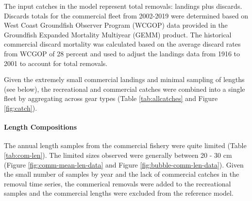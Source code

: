 \documentclass[11pt,
  english,
  a4paper,
]{article}
\begin{document}
\leavevmode\tagmcend\tagstructend\par


The input catches in the model represent total removals: landings plus discards. Discards totals for the commercial fleet from 2002-2019 were determined based on West Coast Groundfish Observer Program (WCGOP) data provided in the Groundfish Expanded Mortality Multiyear (GEMM) product. The historical commercial discard mortality was calculated based on the average discard rates from WCGOP of 28 percent and used to adjust the landings data from 1916 to 2001 to account for total removals.

\leavevmode\tagmcend\tagstructend\par


Given the extremely small commercial landings and minimal sampling of lengths (see below), the recreational and commercial catches were combined into a single fleet by aggregating across gear types (Table \ref{tab:allcatches} and Figure \ref{fig:catch}).

\leavevmode\tagmcend\tagstructend\par


\hypertarget{length-compositions-1}{%
\paragraph{Length Compositions}\label{length-compositions-1}}

\leavevmode\tagmcend\tagstructend


The annual length samples from the commercial fishery were quite limited (Table \ref{tab:com-len}). The limited sizes observed were generally between 20 - 30 cm (Figure \ref{fig:comm-mean-len-data} and Figure \ref{fig:bubble-comm-len-data}). Given the small number of samples by year and the lack of commercial catches in the removal time series, the commerical removals were added to the recreational samples and the commercial lengths were excluded from the reference model.

\leavevmode\tagmcend\tagstructend\par

\end{document}
